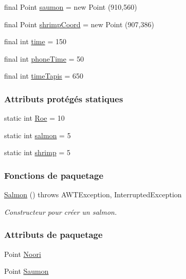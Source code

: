 \begin{DoxyCompactItemize}
\item 
final Point \hyperlink{classTestSushi_1_1src_1_1Suchi_1_1Recette_a855a7ed217eec3565619156fa6cd4214}{saumon} = new Point (910,560)
\item 
final Point \hyperlink{classTestSushi_1_1src_1_1Suchi_1_1Recette_a69faeadec2c0d475bbd77c3b7eeaada7}{shrimp\+Coord} = new Point (907,386)
\item 
final int \hyperlink{classTestSushi_1_1src_1_1Suchi_1_1Recette_a2c78759553661a7e4b01d4ac1212ec6c}{time} = 150
\item 
final int \hyperlink{classTestSushi_1_1src_1_1Suchi_1_1Recette_a0d95a4a68ee0d423b6815b296f3304b2}{phone\+Time} = 50
\item 
final int \hyperlink{classTestSushi_1_1src_1_1Suchi_1_1Recette_a7db8ec6383e36487bc7ca0490edd0b4a}{time\+Tapis} = 650
\end{DoxyCompactItemize}
\subsubsection*{Attributs protégés statiques}
\begin{DoxyCompactItemize}
\item 
static int \hyperlink{classTestSushi_1_1src_1_1Suchi_1_1Recette_ab4ceb10875120aaae2ade481b6088c6d}{Roe} = 10
\item 
static int \hyperlink{classTestSushi_1_1src_1_1Suchi_1_1Recette_a726a712fe936ef2a96982e00d21c49c0}{salmon} = 5
\item 
static int \hyperlink{classTestSushi_1_1src_1_1Suchi_1_1Recette_a07fa939a0df1b7ff45a9d4aa77498e8e}{shrimp} = 5
\end{DoxyCompactItemize}
\subsubsection*{Fonctions de paquetage}
\begin{DoxyCompactItemize}
\item 
\hyperlink{classTestSushi_1_1src_1_1Suchi_1_1Salmon_ae67af12d6703dac822c12a1f126b2f49}{Salmon} ()  throws A\+W\+T\+Exception, Interrupted\+Exception 
\begin{DoxyCompactList}\small\item\em Constructeur pour créer un salmon. \end{DoxyCompactList}\end{DoxyCompactItemize}
\subsubsection*{Attributs de paquetage}
\begin{DoxyCompactItemize}
\item 
Point \hyperlink{classTestSushi_1_1src_1_1Suchi_1_1Salmon_aa19e62a18683ee109fb0da585028d671}{Noori}
\item 
Point \hyperlink{classTestSushi_1_1src_1_1Suchi_1_1Salmon_a5cc030b1723b3af79feb2b51d0d9e3ce}{Saumon}
\end{DoxyCompactItemize}
